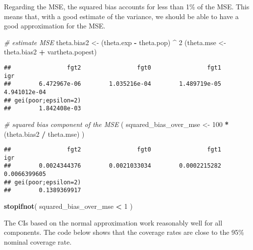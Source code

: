 \documentclass[
]{book}
\newenvironment{Shaded}{\begin{snugshade}}{\end{snugshade}}
\newcommand{\CommentTok}[1]{\textcolor[rgb]{0.56,0.35,0.01}{\textit{#1}}}
\newcommand{\DecValTok}[1]{\textcolor[rgb]{0.00,0.00,0.81}{#1}}
\newcommand{\FunctionTok}[1]{\textcolor[rgb]{0.13,0.29,0.53}{\textbf{#1}}}
\newcommand{\NormalTok}[1]{#1}
\newcommand{\OtherTok}[1]{\textcolor[rgb]{0.56,0.35,0.01}{#1}}
\newcommand{\SpecialCharTok}[1]{\textcolor[rgb]{0.81,0.36,0.00}{\textbf{#1}}}
\begin{document}
Regarding the MSE, the squared bias accounts for less than 1\% of the MSE.
This means that, with a good estimate of the variance, we should be able to have a good approximation for the MSE.

\begin{Shaded}
\begin{Highlighting}[]
\CommentTok{\# estimate MSE}
\NormalTok{theta.bias2 }\OtherTok{\textless{}{-}}\NormalTok{ (theta.exp }\SpecialCharTok{{-}}\NormalTok{ theta.pop) }\SpecialCharTok{\^{}} \DecValTok{2}
\NormalTok{(theta.mse }\OtherTok{\textless{}{-}}\NormalTok{ theta.bias2 }\SpecialCharTok{+}\NormalTok{ vartheta.popest)}
\end{Highlighting}
\end{Shaded}

\begin{verbatim}
##                fgt2                fgt0                fgt1                 igr 
##        6.472967e-06        1.035216e-04        1.489719e-05        4.941012e-04 
## gei(poor;epsilon=2) 
##        1.842408e-03
\end{verbatim}

\begin{Shaded}
\begin{Highlighting}[]
\CommentTok{\# squared bias component of the MSE}
\NormalTok{( squared\_bias\_over\_mse }\OtherTok{\textless{}{-}} \DecValTok{100} \SpecialCharTok{*}\NormalTok{ (theta.bias2 }\SpecialCharTok{/}\NormalTok{ theta.mse) )}
\end{Highlighting}
\end{Shaded}

\begin{verbatim}
##                fgt2                fgt0                fgt1                 igr 
##        0.0024344376        0.0021033034        0.0002215282        0.0066399605 
## gei(poor;epsilon=2) 
##        0.1389369917
\end{verbatim}

\begin{Shaded}
\begin{Highlighting}[]
\FunctionTok{stopifnot}\NormalTok{( squared\_bias\_over\_mse }\SpecialCharTok{\textless{}} \DecValTok{1}\NormalTok{ )}
\end{Highlighting}
\end{Shaded}

The CIs based on the normal approximation work reasonably well for all components. The code below shows that the coverage rates are close to the 95\% nominal coverage rate.
\end{document}
